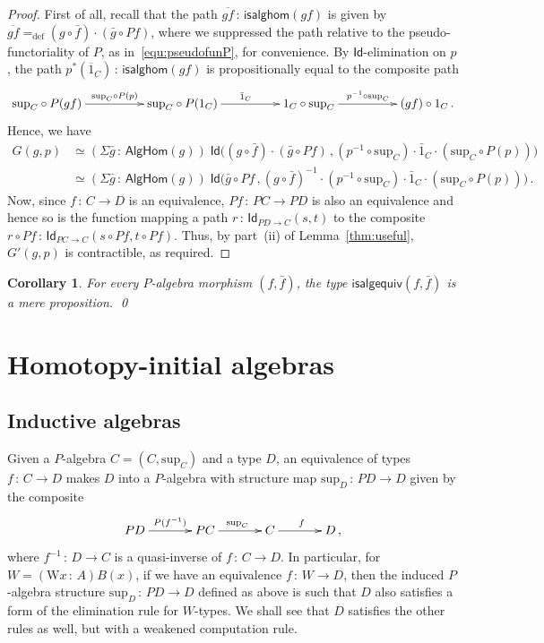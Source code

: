 \documentclass[10pt,a4paper,oneside,reqno]{amsart}
\numberwithin{equation}{section}
\theoremstyle{mythm}
\newtheorem{corollary}[theorem]{Corollary}
\theoremstyle{mydef}
\theoremstyle{myrmk}
\newcommand{\defeq}{=_{\mathrm{def}}}
\newcommand{\co}{\,{:}\,}
\newcommand{\ct}{\cdot}
\newcommand{\Id}{\mathsf{Id}}
\newcommand{\W}{\mathrm{W}}
\renewcommand{\sup}{\mathrm{sup}}
\newcommand{\isalgequiv}{\mathsf{isalgequiv}}
\begin{document}
\begin{proof}
First of all,  recall that the path $\overline{gf} \co  \mathsf{isalghom}(gf) $ is given by 
$\overline{gf} \defeq (g \circ \bar{f}) \ct (\bar{g} \circ Pf )$, 
where we suppressed the path relative to the pseudo-functoriality of $P$, as in~\eqref{equ:pseudofunP}, for convenience. 
By $\Id$-elimination on $p$, the path $p^*(\overline{1}_C) \co \mathsf{isalghom}(gf)$ is propositionally equal to the composite path
\[
\xymatrix@C=1.7cm{
\sup_C \circ P(gf) \ar[r]^{\sup_C \circ P(p)} & \sup_C \circ P(1_C) \ar[r]^{\bar{1}_C} & 1_C \circ \sup_C \ar[r]^{p^{-1} \circ \sup_C} & 
(g f) \circ 1_C \, .}
\]
Hence, we have 
\begin{align*} 
G(g,p)  & \simeq  (\Sigma \bar{g} \co  \mathsf{AlgHom}(g))  \; 
\Id \big( (g \circ \bar{f}) \ct (\bar{g} \circ Pf ) \, , 
  (p^{-1} \circ \sup_C) \ct \bar{1}_C \ct (\sup_C \circ P(p)) \big) \\
& \simeq 
(\Sigma \bar{g} \co  \mathsf{AlgHom}(g))  \; 
\Id \big( \bar{g} \circ Pf  \, , (g \circ \bar{f})^{-1} \ct 
  (p^{-1} \circ \sup_C) \ct \bar{1}_C \ct (\sup_C \circ P(p)) \big) \, .
\end{align*} 
Now, since $f \co C \to D$ is an equivalence, $Pf \co PC \to PD$ is also an equivalence and hence so
is the function mapping a path $r \co \Id_{PD \to C}(s,t)$ to the composite $r \circ Pf \co \Id_{PC \to C}( s \circ Pf, t \circ Pf)$. Thus, by part~(ii) of Lemma~\ref{thm:useful}, $G'(g,p)$ is contractible, as required.
\end{proof} 




\begin{corollary} For every $P$-algebra morphism $(f, \bar{f})$, the type $\isalgequiv(f, \bar{f})$ is
a mere proposition. \qed
\end{corollary} 

 

\section{Homotopy-initial algebras}
\label{sec:homta}

\subsection*{Inductive algebras}
Given a $P$-algebra $C = (C, \sup_C)$ and a type $D$, an equivalence of types $f \co C \to D$ makes $D$ into a $P$-algebra with structure map $\sup_D \co PD \to D$ given by the composite
\[
\xymatrix@C=1.2cm{
PD \ar[r]^{P(f^{-1})} & PC \ar[r]^{\sup_C} & C \ar[r]^f & D \, , }
\]
 where $f^{-1} \co D \to C$ is a quasi-inverse of $f \co C \to D$. In particular, for $W = (\W x \co A) B(x)$, if we have an equivalence  
 $f \co W \to D$, then the induced $P$-algebra structure $\sup_D \co PD \to D$ defined as above is such that $D$ also satisfies 
 a form of the elimination rule for $W$-types.  We shall see that $D$ satisfies the other rules as well, but with a weakened computation rule.
\end{document}
